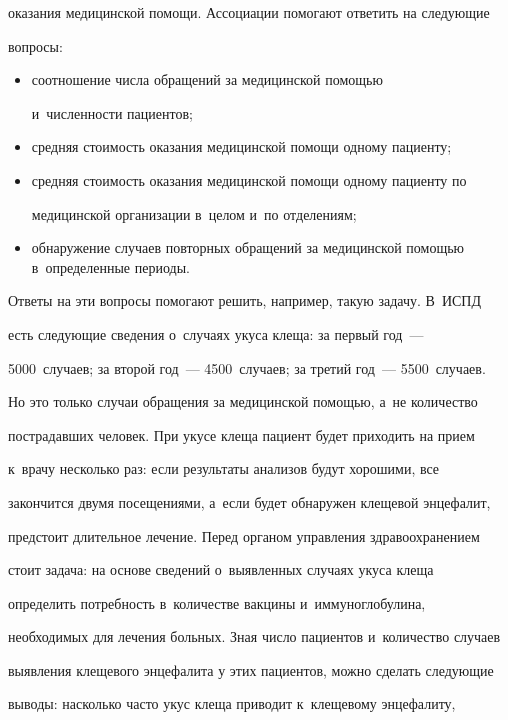 оказания медицинской помощи. Ассоциации помогают ответить на следующие 


вопросы:


  \begin{itemize}


  \item соотношение числа обращений за медицинской помощью 


  и~численности пациентов;


  \item средняя стоимость оказания медицинской помощи одному пациенту;


  \item средняя стоимость оказания медицинской помощи одному пациенту по 


медицинской организации в~целом и~по отделениям;


  \item обнаружение случаев повторных обращений за медицинской помощью в~определенные периоды.


  \end{itemize}


  


  Ответы на эти вопросы помогают решить, например, такую задачу. В~ИСПД 


есть следующие сведения о~случаях укуса клеща: за первый год~--- 


5000~случаев; за второй год~--- 4500~случаев; за третий год~--- 5500~случаев. 


Но это только случаи обращения за медицинской помощью, а~не количество 


пострадавших человек. При укусе клеща пациент будет приходить на прием 


к~врачу несколько раз: если результаты анализов будут хорошими, все 


закончится двумя посещениями, а~если будет обнаружен клещевой энцефалит, 


предстоит длительное лечение. Перед органом управления здравоохранением 


стоит задача: на основе сведений о~выявленных случаях укуса клеща 


определить потребность в~количестве вакцины и~иммуноглобулина, 


необходимых для лечения больных. Зная число пациентов и~количество случаев 


выявления клещевого энцефалита у этих пациентов, можно сделать следующие 


выводы: насколько часто укус клеща приводит к~клещевому энцефалиту, 


